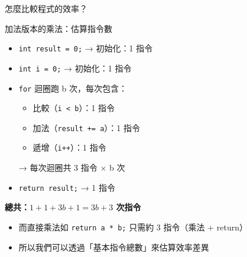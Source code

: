 \documentclass{beamer}
\begin{document}
\begin{frame}{怎麼比較程式的效率？}

\vspace{0.5em}
\begin{block}{加法版本的乘法：估算指令數}
\begin{itemize}
    \item \texttt{int result = 0;} → 初始化：1 指令
    \item \texttt{int i = 0;} → 初始化：1 指令
    \item \texttt{for} 迴圈跑 b 次，每次包含：
    \begin{itemize}
        \item 比較（\texttt{i < b}）：1 指令
        \item 加法（\texttt{result += a}）：1 指令
        \item 遞增（\texttt{i++}）：1 指令
    \end{itemize}
    → 每次迴圈共 3 指令 × b 次
    \item \texttt{return result;} → 1 指令
\end{itemize}
\textbf{總共：$1 + 1 + 3b + 1 = 3b + 3$ 次指令}
\end{block}

\vspace{0.5em}
\begin{itemize}
    \item 而直接乘法如 \texttt{return a * b;} 只需約 3 指令（乘法 + return）
    \item 所以我們可以透過「基本指令總數」來估算效率差異
\end{itemize}
\end{frame}
\end{document}
